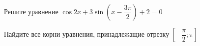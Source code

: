 \begin{ex}
	\begin{condition}
		\begin{enumcols}[label=\asbuk*)]
			\item Решите уравнение \( \cos 2x + 3\sin {\left(x -\dfrac{3\pi}{2}\right)} + 2 = 0 \)
			\item Найдите все корни уравнения, принадлежащие отрезку \(\left[-\dfrac{\pi}{2};\pi\right]  \)
		\end{enumcols}
	\end{condition}
\end{ex}